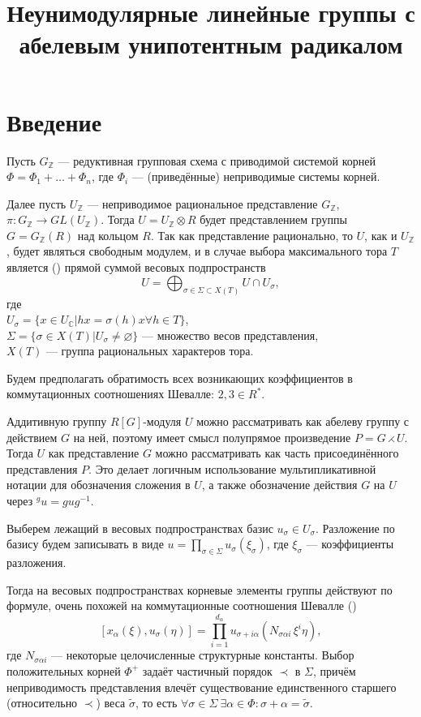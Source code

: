 \documentclass[10pt]{article}
\title{Неунимодулярные линейные группы с абелевым унипотентным радикалом}
\author{}
\date{}
\theoremstyle{remark}
\newcommand{\Z}{\mathbb{Z}}
\renewcommand{\C}{\mathbb{C}}
\begin{document}
\maketitle


\section{Введение}

Пусть $G_\Z$ --- редуктивная групповая схема с приводимой системой корней $\Phi = \Phi_1 + \dots + \Phi_n$, где $\Phi_i$ --- (приведённые) неприводимые системы корней.

Далее пусть $U_\Z$ --- неприводимое рациональное представление $G_\Z$, $\pi:G_\Z \to GL(U_\Z)$. Тогда $U=U_\Z\otimes R$ будет представлением группы $G=G_\Z(R)$ над кольцом $R$. Так как представление рационально, то $U$, как и $U_\Z$, будет являться свободным модулем, и в случае выбора максимального тора $T$ является (\citep{Borel1970}) прямой суммой весовых подпространств
$$U=\bigoplus_{\sigma \in \Sigma \subset X(T)} {U \cap U_\sigma} ,$$
где\\
$U_\sigma = \{x \in U_\C | h x = \sigma(h) x \forall h \in T \}$,\\
$\Sigma = \{\sigma \in X(T) | U_\sigma \ne \varnothing\}$ --- множество весов представления,\\
$X(T)$ --- группа рациональных характеров тора.

Будем предполагать обратимость всех возникающих коэффициентов в коммутационных соотношениях Шевалле: $2,3 \in R^* $. %

Аддитивную группу $R[G]$-модуля $U$ можно рассматривать как абелеву группу с действием $G$ на ней, поэтому
имеет смысл полупрямое произведение $P = G \rightthreetimes U$.
Тогда $U$ как представление $G$ можно рассматривать как часть присоединённого представления $P$. Это делает логичным использование мультипликативной нотации для обозначения сложения в $U$, а также обозначение действия $G$ на $U$ через $^{g}u = g u g^{-1}$. 

Выберем лежащий в весовых подпространствах базис $u_\sigma \in U_\sigma$. Разложение по базису будем записывать в виде $u = \prod_{\sigma \in \Sigma} u_\sigma(\xi_\sigma)$, где $\xi_\sigma$ --- коэффициенты разложения.

Тогда на весовых подпространствах корневые элементы группы действуют по формуле, очень похожей на коммутационные соотношения Шевалле (\citep{StepanovDissert})
\begin{equation}\label{eq:commutator_relation}
[x_\alpha(\xi), u_\sigma(\eta)] = \prod_{i=1}^{d_\alpha} u_{\sigma+i\alpha}(N_{\sigma\alpha i}\,\xi^i \eta),
\end{equation}
где $N_{\sigma\alpha i}$ ---  некоторые целочисленные структурные константы. Выбор положительных корней $\Phi^+$ задаёт частичный порядок $\prec$ в $\Sigma$, причём неприводимость представления влечёт существование единственного старшего (относительно $\prec$) веса $\widetilde{\sigma}$, то есть $\forall \sigma \in \Sigma \  \exists \alpha \in \Phi : \sigma+\alpha = \widetilde{\sigma}$.
\end{document}
